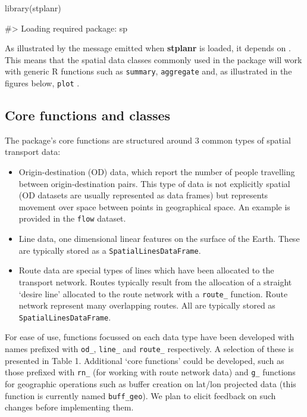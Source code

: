 \begin{Schunk}
\begin{Sinput}
library(stplanr)
\end{Sinput}
\begin{Soutput}
#> Loading required package: sp
\end{Soutput}
\end{Schunk}

As illustrated by the message emitted when \textbf{stplanr} is loaded,
it depends on . This means that the spatial data classes
commonly used in the package will work with generic R functions such as
\texttt{summary}, \texttt{aggregate} and, as illustrated in the figures
below, \texttt{plot} \citep{bivand_applied_2013}.

\subsection{Core functions and
classes}\label{core-functions-and-classes}

The package's core functions are structured around 3 common types of
spatial transport data:

\begin{itemize}
\tightlist
\item
  Origin-destination (OD) data, which report the number of people
  travelling between origin-destination pairs. This type of data is not
  explicitly spatial (OD datasets are usually represented as data
  frames) but represents movement over space between points in
  geographical space. An example is provided in the \texttt{flow}
  dataset.
\item
  Line data, one dimensional linear features on the surface of the
  Earth. These are typically stored as a \texttt{SpatialLinesDataFrame}.
\item
  Route data are special types of lines which have been allocated to the
  transport network. Routes typically result from the allocation of a
  straight `desire line' allocated to the route network with a
  \texttt{route\_} function. Route network represent many overlapping
  routes. All are typically stored as \texttt{SpatialLinesDataFrame}.
\end{itemize}

For ease of use, functions focussed on each data type have been
developed with names prefixed with \texttt{od\_}, \texttt{line\_} and
\texttt{route\_} respectively. A selection of these is presented in
Table 1. Additional `core functions' could be developed, such as those
prefixed with \texttt{rn\_} (for working with route network data) and
\texttt{g\_} functions for geographic operations such as buffer creation
on lat/lon projected data (this function is currently named
\texttt{buff\_geo}). We plan to elicit feedback on such changes before
implementing them.

